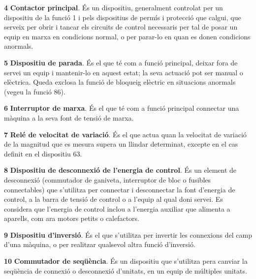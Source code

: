 \begin{multicols}{2}
\begin{list}{}
\item[\textbf{4}]  
 \textbf{Contactor principal}. És un dispositiu,
generalment controlat per un dispositiu de la funció 1 i pels dispositius de permís i protecció
que calgui, que serveix per obrir i tancar els circuits de control necessaris per tal de
posar un equip en marxa en condicions normal, o per parar-lo en quan es donen condicions anormals.

\item[\textbf{5}]    
 \textbf{Dispositiu de parada}. És el que
té com a funció principal, deixar fora de servei un equip i
mantenir-lo en aquest estat; la seva actuació pot ser manual o
elèctrica. Queda exclosa la funció de bloqueig elèctric en
situacions anormals (vegeu la funció 86).

\item[\textbf{6}]  
\textbf{Interruptor de marxa}. És
el que té com a funció principal connectar una màquina a la seva font de tensió de marxa.

\item[\textbf{7}]    
\textbf{Relé de velocitat de variació}. És el que
actua quan la velocitat de variació de la magnitud que es mesura supera un llindar determinat, excepte en el cas definit en el dispositiu 63.

\item[\textbf{8}]   
\textbf{Dispositiu de desconnexió de l'energia
de control}. És un element de desconnexió (commutador de ganiveta,
interruptor de bloc o fusibles connectables) que s'utilitza per
connectar i desconnectar la font d'energia de control,  a la barra
de tensió de control o a l'equip al qual doni servei. Es considera
que l'energia de control inclou a l'energia auxiliar que alimenta a
aparells, com ara motors petits o calefactors.

\item[\textbf{9}]   
\textbf{Dispositiu d'inversió}. És el
que s'utilitza per invertir les connexions del camp d'una màquina, o
per realitzar qualsevol altra funció  d'inversió.

\item[\textbf{10}]   
\textbf{Commutador de seqüència}. És un
dispositiu que s'utilitza pera canviar la seqüència de connexió o
desconnexió d'unitats, en un equip de múltiples unitats.



\end{list}
\end{multicols}
